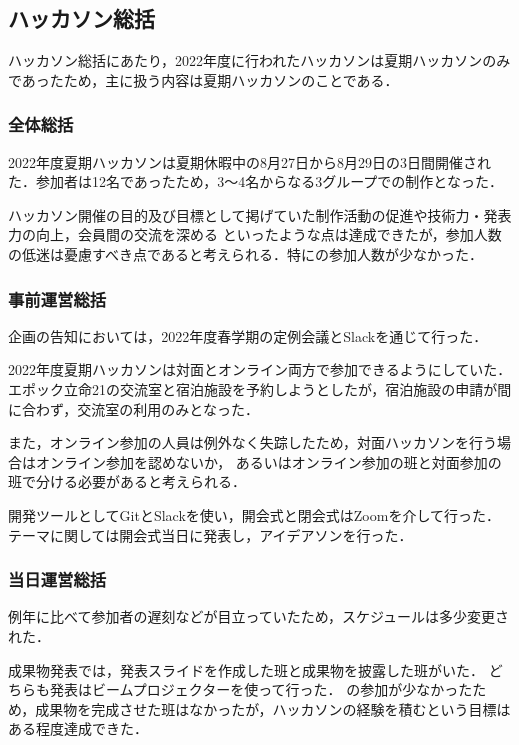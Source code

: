 \subsection*{ハッカソン総括}


ハッカソン総括にあたり，2022年度に行われたハッカソンは夏期ハッカソンのみであったため，主に扱う内容は夏期ハッカソンのことである．

\subsubsection*{全体総括}

2022年度夏期ハッカソンは夏期休暇中の8月27日から8月29日の3日間開催された．参加者は12名であったため，3〜4名からなる3グループでの制作となった．

ハッカソン開催の目的及び目標として掲げていた制作活動の促進や技術力・発表力の向上，会員間の交流を深める
といったような点は達成できたが，参加人数の低迷は憂慮すべき点であると考えられる．特に\thirdGrade{}の参加人数が少なかった．

\subsubsection*{事前運営総括}

企画の告知においては，2022年度春学期の定例会議とSlackを通じて行った．

2022年度夏期ハッカソンは対面とオンライン両方で参加できるようにしていた．
エポック立命21の交流室と宿泊施設を予約しようとしたが，宿泊施設の申請が間に合わず，交流室の利用のみとなった．

また，オンライン参加の人員は例外なく失踪したため，対面ハッカソンを行う場合はオンライン参加を認めないか，
あるいはオンライン参加の班と対面参加の班で分ける必要があると考えられる．

開発ツールとしてGitとSlackを使い，開会式と閉会式はZoomを介して行った．
テーマに関しては開会式当日に発表し，アイデアソンを行った．

\subsubsection*{当日運営総括}

例年に比べて参加者の遅刻などが目立っていたため，スケジュールは多少変更された．

成果物発表では，発表スライドを作成した班と成果物を披露した班がいた．
どちらも発表はビームプロジェクターを使って行った．
\thirdGrade{}の参加が少なかったため，成果物を完成させた班はなかったが，ハッカソンの経験を積むという目標はある程度達成できた．
